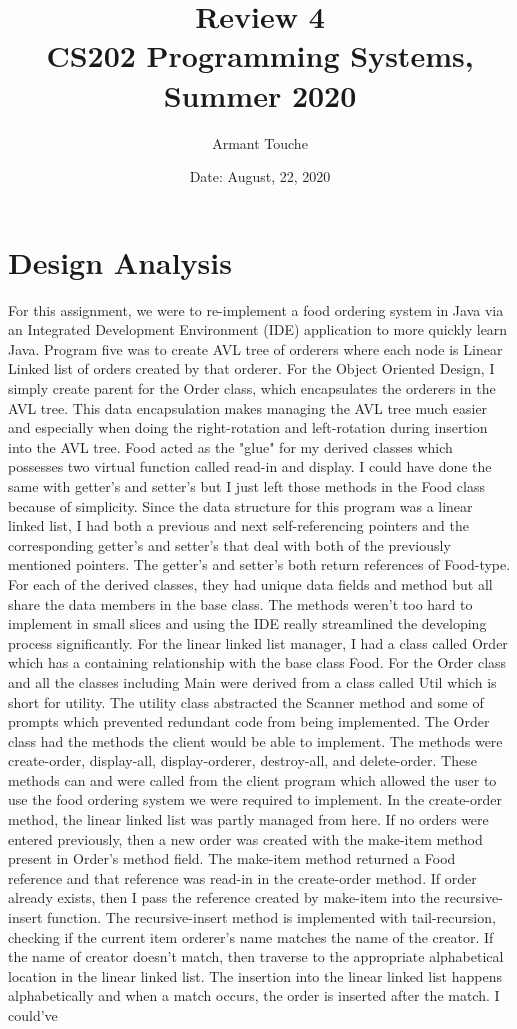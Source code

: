 \documentclass[11pt, a4paper]{article}
\title{\bf Review 4\\[1ex]
\rm\normalsize CS202 Programming Systems, Summer 2020 }
\date{\normalsize Date: August, 22, 2020}
\author{\normalsize Armant Touche}
\begin{document}
\vspace{0cm}\maketitle 

\section*{Design Analysis}
For this assignment, we were to re-implement a food ordering system in Java via an Integrated Development Environment (IDE) application to more quickly learn Java. Program five was to create AVL tree of orderers where each node is Linear Linked list of orders created by that orderer. For the Object Oriented Design, I simply create parent for the Order class, which encapsulates the orderers in the AVL tree. This data encapsulation makes managing the AVL tree much easier and especially when doing the right-rotation and left-rotation during insertion into the AVL tree. Food acted as the "glue" for my derived classes which possesses two virtual function called read-in and display. I could have done the same with getter's and setter's but I just left those methods in the Food class because of simplicity. Since the data structure for this program was a linear linked list, I had both a previous and next self-referencing pointers and the corresponding getter's and setter's that deal with both of the previously mentioned pointers. The getter's and setter's both return references of Food-type. For each of the derived classes, they had unique data fields and method but all share the data members in the base class. The methods weren't too hard to implement in small slices and using the IDE really streamlined the developing process significantly. For the linear linked list manager, I had a class called Order which has a containing relationship with the base class Food. For the Order class and all the classes including Main were derived from a class called Util which is short for utility. The utility class abstracted the Scanner method and some of prompts which prevented redundant code from being implemented. The Order class had the methods the client would be able to implement. The methods were create-order, display-all, display-orderer, destroy-all, and delete-order. These methods can and were called from the client program which allowed the user to use the food ordering system we were required to implement. In the create-order method, the linear linked list was partly managed from here. If no orders were entered previously, then a new order was created with the make-item method present in Order's method field. The make-item method returned a Food reference and that reference was read-in in the create-order method. If order already exists, then I pass the reference created by make-item into the recursive-insert function. The recursive-insert method is implemented with tail-recursion, checking if the current item orderer's name matches the name of the creator. If the name of creator doesn't match, then traverse to the appropriate alphabetical location in the linear linked list. The insertion into the linear linked list happens alphabetically and when a match occurs, the order is inserted after the match. I could've 
\end{document}
